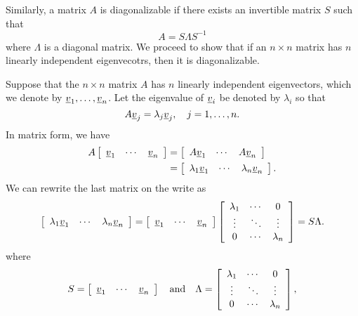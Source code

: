 Similarly, a matrix $A$ is diagonalizable if there exists an invertible matrix $S$ such that
\begin{equation*}
A = S \Lambda S^{-1}
\end{equation*}
where $\Lambda$ is a diagonal matrix.
We proceed to show that if an $n \times n$ matrix has $n$ linearly independent eigenvecotrs, then it is diagonalizable.

Suppose that the $n \times n$ matrix $A$ has $n$ linearly independent eigenvectors, which we denote by $\underline{v}_1, \ldots, \underline{v}_n$.
Let the eigenvalue of $\underline{v}_i$ be denoted by $\lambda_i$ so that
\begin{equation*}
A \underline{v}_j = \lambda_j \underline{v}_j, \quad j = 1, \ldots, n.
\end{equation*}
In matrix form, we have
\begin{equation*}
\begin{split}
A \left[ \begin{array}{ccc} \underline{v}_1 & \cdots & \underline{v}_n \end{array} \right]
&= \left[ \begin{array}{ccc} A \underline{v}_1 & \cdots & A \underline{v}_n \end{array} \right] \\
&= \left[ \begin{array}{ccc} \lambda_1 \underline{v}_1 & \cdots & \lambda_n \underline{v}_n \end{array} \right] .
\end{split}
\end{equation*}
We can rewrite the last matrix on the write as
\begin{equation*}
\left[ \begin{array}{ccc} \lambda_1 \underline{v}_1 & \cdots & \lambda_n \underline{v}_n \end{array} \right]
= \left[ \begin{array}{ccc} \underline{v}_1 & \cdots & \underline{v}_n \end{array} \right]
\left[ \begin{array}{ccc}
\lambda_1 & \cdots & 0 \\
\vdots & \ddots & \vdots \\
0 & \cdots & \lambda_n
\end{array} \right]
= S \Lambda .
\end{equation*}
where
\begin{equation*}
S = \left[ \begin{array}{ccc} \underline{v}_1 & \cdots & \underline{v}_n \end{array} \right]
\quad \text{and} \quad
\Lambda = \left[ \begin{array}{ccc}
\lambda_1 & \cdots & 0 \\
\vdots & \ddots & \vdots \\
0 & \cdots & \lambda_n
\end{array} \right] ,
\end{equation*}

